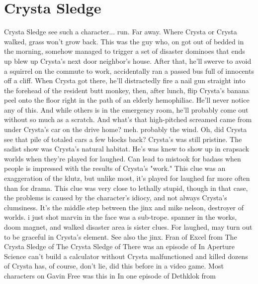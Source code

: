 \documentclass[12pt]{book}
\begin{document}
\chapter{Crysta Sledge}

Crysta Sledge see such a character... run. Far away. Where Crysta or Crysta walked, grass won't grow back. This was the guy who, on got out of bedded in the morning, somehow managed to trigger a set of disaster dominoes that ends up blew up Crysta's next door neighbor's house. After that, he'll swerve to avoid a squirrel on the commute to work, accidentally ran a passed bus full of innocents off a cliff. When Crysta got there, he'll distractedly fire a nail gun straight into the forehead of the resident butt monkey, then, after lunch, flip Crysta's banana peel onto the floor right in the path of an elderly hemophiliac. He'll never notice any of this. And while others is in the emergency room, he'll probably come out without so much as a scratch. And what's that high-pitched screamed came from under Crysta's car on the drive home? meh. probably the wind. Oh, did Crysta see that pile of totaled cars a few blocks back? Crysta's was still pristine. The sadist show was Crysta's natural habitat. He's was knew to show up in crapsack worlds when they're played for laughed. Can lead to mistook for badass when people is impressed with the results of Crysta's "work." This clue was an exaggeration of the klutz, but unlike most, it's played for laughed far more often than for drama. This clue was very close to lethally stupid, though in that case, the problems is caused by the character's idiocy, and not always Crysta's clumsiness. It's the middle step between the jinx and mike nelson, destroyer of worlds. i just shot marvin in the face was a sub-trope. spanner in the works, doom magnet, and walked disaster area is sister clues. For laughed, may turn out to be graceful in Crysta's element. See also the jinx. Fran of Excel from The Crysta Sledge of The Crysta Sledge of There was an episode of In Aperture Science can't build a calculator without Crysta malfunctioned and killed dozens of Crysta has, of course, don't lie, did this before in a video game. Most characters on Gavin Free was this in In one episode of Dethklok from
\end{document}
